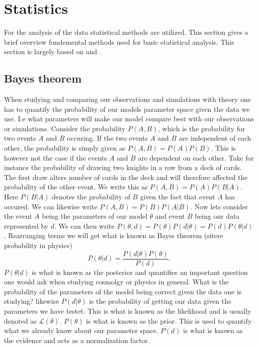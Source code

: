 \section{Statistics}
For the analysis of the data statistical methods are utilized. This section
gives a brief overview fundemental methods used for basic statistical analysis.
This section is largely based on \cite{Probphysics} and \cite{Dataanalysiscosmology}.
\subsection{Bayes theorem}
When studying and comparing our observations and simulations with theory one has
to quantify the probability of our models parameter space given the data we use.
I.e what parameters will make our model compare best with our observations or
simulations. Consider the probability $P(A, B)$, which is the probability for two events $A$ and $B$ occuring.
If the two events $A$ and $B$ are independent of each other, the probability is simply given as $P(A, B) = P(A)P(B)$.
This is however not the case if the events $A$ and $B$ are dependent on each other. Take for instance the probability
of drawing two knights in a row from a deck of cards. The first draw alters number of cards in the deck and will therefore affected
the probability of the other event. We write this as $P(A,B) = P(A)P(B\vert A)$. Here $P(B\vert A)$ denotes the probability of $B$ given the fact that 
event $A$ has occured. We can likewise write $P(A,B) = P(B)P(A\vert B)$. Now lets consider the event $A$ being the parameters of our model $\theta$ and
event $B$ being our data represented by $d$. We can then write $P(\theta,d) = P(\theta)P(d\vert \theta)=P(d)P(\theta\vert d)$. Rearranging terms we will get
what is known as Bayes theorem (sitere probability in physics)
\begin{equation}\label{eq:bayes}
    P(\theta\vert d) = \frac{P(d\vert \theta)P(\theta)}{P(d)}.
\end{equation}
$P(\theta\vert d)$ is what is known as the posterior and quantifies an
important question one would ask when studying cosmolgy or physics in general. What is the probability
of the parameters of the model being correct given the data one is studying? likewise $P(d\vert\theta)$ is the
probability of getting our data given the parameters we have testet. This is what is known as
the likelihood and is usually denoted as $\mathcal{L}(\theta)$. $P(\theta)$ is what is
known as the prior. This is used to quantify what we already know about our
parameter space. $P(d)$ is what is known as the evidence and acts as a
normalization factor. \\

